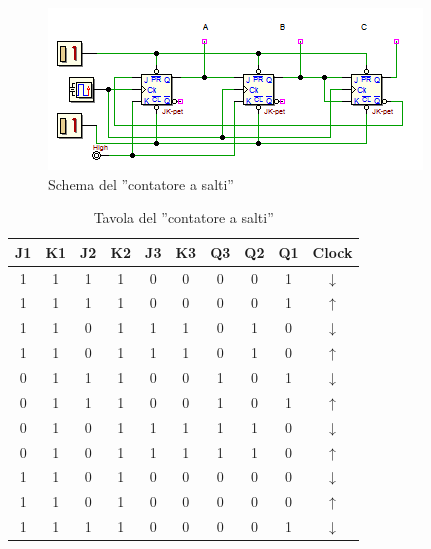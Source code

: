 \documentclass[journal, a4paper]{IEEEtran}
\begin{document}
\begin{figure}[htp]
\centering
\includegraphics[scale=.8]{hm6}
\caption{Schema del ''contatore a salti''}
\label{fig:contcazzodicane}
\end{figure}

\begin{table}[htp]
\centering
\caption{Tavola del ''contatore a salti''}
\label{tab:countcazzodicane}
\begin{tabular}{c|c|c|c|c|c|c|c|c|c}

\textbf{J1} &\textbf{ K1} & \textbf{J2} & \textbf{K2} & \textbf{J3} & \textbf{K3 }& \textbf{Q3} &\textbf{ Q2} & \textbf{Q1} & Clock \\ 
\hline
1 & 1 & 1 & 1 & 0 & 0 & 0 & 0 & 1 & $\downarrow$ \\ 

1 & 1 & 1 & 1 & 0 & 0 & 0 & 0 & 1 & $\uparrow$ \\ 

1 & 1 & 0 & 1 & 1 & 1 & 0 & 1 & 0 & $\downarrow$ \\ 
 
1 & 1 & 0 & 1 & 1 & 1 & 0 & 1 & 0 & $\uparrow$ \\ 

0 & 1 & 1 & 1 & 0 & 0 & 1 & 0 & 1 & $\downarrow$ \\ 

0 & 1 & 1 & 1 & 0 & 0 & 1 & 0 & 1 & $\uparrow$ \\ 

0 & 1 & 0 & 1 & 1 & 1 & 1 & 1 & 0 & $\downarrow$ \\ 

0 & 1 & 0 & 1 & 1 & 1 & 1 & 1 & 0 & $\uparrow$ \\ 

1 & 1 & 0 & 1 & 0 & 0 & 0 & 0 & 0 & $\downarrow$ \\ 
 
1 & 1 & 0 & 1 & 0 & 0 & 0 & 0 & 0 & $\uparrow$ \\ 

1 & 1 & 1 & 1 & 0 & 0 & 0 & 0 & 1 & $\downarrow$ \\ 
\hline
\end{tabular} 
\end{table}
~\\
\end{document}
